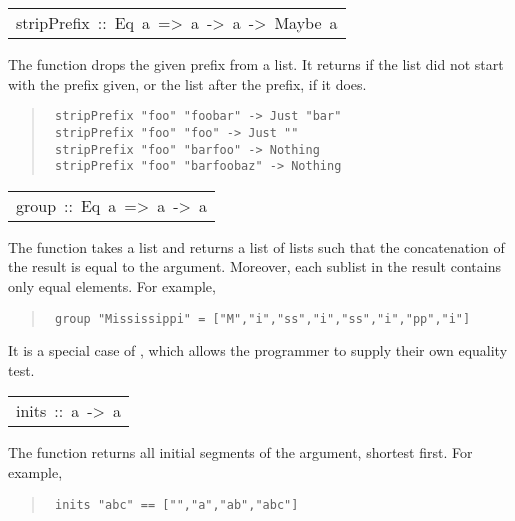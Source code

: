 \begin{haddockdesc}
\item[\begin{tabular}{@{}l}
stripPrefix\ ::\ Eq\ a\ =>\ {\char 91}a{\char 93}\ ->\ {\char 91}a{\char 93}\ ->\ Maybe\ {\char 91}a{\char 93}
\end{tabular}]\haddockbegindoc
The  function drops the given prefix from a list.
 It returns  if the list did not start with the prefix
 given, or  the list after the prefix, if it does.
\par
\begin{quote}
{\haddockverb\begin{verbatim}
 stripPrefix "foo" "foobar" -> Just "bar"
 stripPrefix "foo" "foo" -> Just ""
 stripPrefix "foo" "barfoo" -> Nothing
 stripPrefix "foo" "barfoobaz" -> Nothing
\end{verbatim}}
\end{quote}

\end{haddockdesc}
\begin{haddockdesc}
\item[\begin{tabular}{@{}l}
group\ ::\ Eq\ a\ =>\ {\char 91}a{\char 93}\ ->\ {\char 91}{\char 91}a{\char 93}{\char 93}
\end{tabular}]\haddockbegindoc
The  function takes a list and returns a list of lists such
 that the concatenation of the result is equal to the argument.  Moreover,
 each sublist in the result contains only equal elements.  For example,
\par
\begin{quote}
{\haddockverb\begin{verbatim}
 group "Mississippi" = ["M","i","ss","i","ss","i","pp","i"]
\end{verbatim}}
\end{quote}
It is a special case of , which allows the programmer to supply
 their own equality test.
\par

\end{haddockdesc}
\begin{haddockdesc}
\item[\begin{tabular}{@{}l}
inits\ ::\ {\char 91}a{\char 93}\ ->\ {\char 91}{\char 91}a{\char 93}{\char 93}
\end{tabular}]\haddockbegindoc
The  function returns all initial segments of the argument,
 shortest first.  For example,
\par
\begin{quote}
{\haddockverb\begin{verbatim}
 inits "abc" == ["","a","ab","abc"]
\end{verbatim}}
\end{quote}

\end{haddockdesc}
